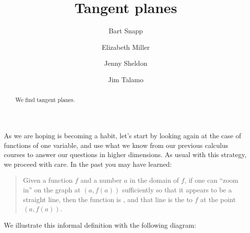 \documentclass{ximera}
\author{Bart Snapp \and Elizabeth Miller \and Jenny Sheldon \and Jim Talamo}
\title[Dig-In:]{Tangent planes}
\begin{document}
\begin{abstract}
  We find tangent planes.
\end{abstract}
\maketitle

As we are hoping is becoming a habit, let's start by looking again at
the case of functions of one variable, and use what we know from our
previous calculus courses to answer our questions in higher
dimensions.  As usual with this strategy, we proceed with care.  In
the past you may have learned:
\begin{quote}
Given a function $f$ and a number $a$ in the domain of $f$, if one can
``zoom in'' on the graph at $(a, f(a))$ sufficiently so that it
appears to be a straight line, then the function is
, and that line is the  to
$f$ at the point $(a,f(a))$.
\end{quote}
We illustrate this informal definition with the following diagram:
\end{document}
